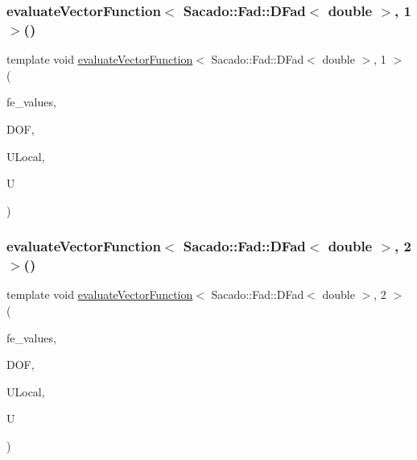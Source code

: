 \subsubsection{\texorpdfstring{evaluate\+Vector\+Function$<$ Sacado\+::\+Fad\+::\+D\+Fad$<$ double $>$, 1 $>$()}{evaluateVectorFunction< Sacado::Fad::DFad< double >, 1 >()}}
{\footnotesize\ttfamily template void \mbox{\hyperlink{group___evaluation_functions_gab9e164be1be244df81c932426a4bd513}{evaluate\+Vector\+Function}}$<$ Sacado\+::\+Fad\+::\+D\+Fad$<$ double $>$, 1 $>$ (\begin{DoxyParamCaption}\item[{const F\+E\+Values$<$ 1 $>$ \&}]{fe\+\_\+values,  }\item[{unsigned int}]{D\+OF,  }\item[{Table$<$ 1, Sacado\+::\+Fad\+::\+D\+Fad$<$ double $>$$>$ \&}]{U\+Local,  }\item[{Table$<$ 2, Sacado\+::\+Fad\+::\+D\+Fad$<$ double $>$$>$ \&}]{U }\end{DoxyParamCaption})}

\mbox{\label{function_evaluations_8cc_a28ceac224510d9b9753dbe934874d56b}} 
\subsubsection{\texorpdfstring{evaluate\+Vector\+Function$<$ Sacado\+::\+Fad\+::\+D\+Fad$<$ double $>$, 2 $>$()}{evaluateVectorFunction< Sacado::Fad::DFad< double >, 2 >()}}
{\footnotesize\ttfamily template void \mbox{\hyperlink{group___evaluation_functions_gab9e164be1be244df81c932426a4bd513}{evaluate\+Vector\+Function}}$<$ Sacado\+::\+Fad\+::\+D\+Fad$<$ double $>$, 2 $>$ (\begin{DoxyParamCaption}\item[{const F\+E\+Values$<$ 2 $>$ \&}]{fe\+\_\+values,  }\item[{unsigned int}]{D\+OF,  }\item[{Table$<$ 1, Sacado\+::\+Fad\+::\+D\+Fad$<$ double $>$$>$ \&}]{U\+Local,  }\item[{Table$<$ 2, Sacado\+::\+Fad\+::\+D\+Fad$<$ double $>$$>$ \&}]{U }\end{DoxyParamCaption})}

